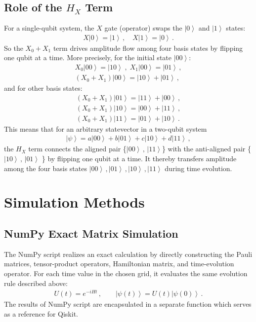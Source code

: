 \documentclass[11pt]{article}
\numberwithin{equation}{section}
\newcommand{\ket}[1]{\left| #1 \right\rangle} %
\begin{document}
\subsection{Role of the \texorpdfstring{$H_X$}{H\_X} Term}
For a single-qubit system, the $X$ gate (operator) swaps the $\ket{0}$ and $\ket{1}$ states:
\begin{align*}
  X\ket{0} = \ket{1} \,, \quad
  X\ket{1} = \ket{0} \,.
\end{align*}
So the $X_0 + X_1$ term drives amplitude flow among four basis states by flipping one qubit at a time. More precisely, for the initial state $\ket{00}$:
\begin{gather*}
  X_0\ket{00} = \ket{10} \;,\; X_1\ket{00} = \ket{01} \,, \\
  (X_0 + X_1)\ket{00} = \ket{10} + \ket{01} \,,
\end{gather*}
and for other basis states:
\begin{align*}
    (X_0 + X_1)\ket{01} = \ket{11} + \ket{00} \,, \\
    (X_0 + X_1)\ket{10} = \ket{00} + \ket{11} \,, \\
    (X_0 + X_1)\ket{11} = \ket{01} + \ket{10} \,.
\end{align*}
This means that for an arbitrary statevector in a two-qubit system
\begin{align*}
    \ket{\psi} = a\ket{00} + b\ket{01} + c\ket{10} + d\ket{11}\,,
\end{align*}
the $H_X$ term connects the aligned pair \{$\ket{00} \,,\, \ket{11}$\} with the anti-aligned pair \{$\ket{10} \,,\, \ket{01}$ \} by flipping one qubit at a time. It thereby transfers amplitude among the four basis states $\ket{00}\,, \ket{01}\,, \ket{10}\,, \ket{11}$ during time evolution.





\section{Simulation Methods}
\subsection{NumPy Exact Matrix Simulation}
The NumPy script realizes an exact calculation by directly constructing the Pauli matrices, tensor-product operators, Hamiltonian matrix, and time-evolution operator. For each time value in the chosen grid, it evaluates the same evolution rule described above:
\begin{align*}
  U(t) = e^{-iHt} \,, \qquad  \ket{\psi(t)} = U(t)\ket{\psi(0)} \,.
\end{align*}
The results of NumPy script are encapsulated in a separate function which serves as a reference for Qiskit.
\end{document}
